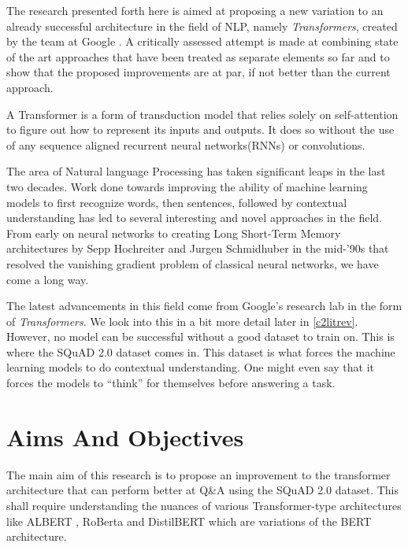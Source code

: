 \documentclass[a4paper,12pt]{report}
\begin{document}
		    The research presented forth here is aimed at proposing a new variation to an already successful architecture in the field of NLP, namely \textit{Transformers}, created by the team at Google \citep{atayl}. A critically assessed attempt is made at combining state of the art approaches that have been treated as separate elements so far and to show that the proposed improvements are at par, if not better than the current approach.

		    A Transformer is a form of transduction model that relies solely on self-attention to figure out how to represent its inputs and outputs. It does so without the use of any sequence aligned recurrent neural networks(RNNs) or convolutions.

            The area of Natural language Processing has taken significant leaps in the last two decades. Work done towards improving the ability of machine learning models to first recognize words, then sentences, followed by contextual understanding has led to several interesting and novel approaches in the field. From early on neural networks to creating Long Short-Term Memory architectures \citep{lstmoriginal} by Sepp Hochreiter and Jurgen Schmidhuber in the mid-'90s that resolved the vanishing gradient problem of classical neural networks, we have come a long way.

           The latest advancements in this field come from Google's research lab in the form of \textit{Transformers}. We look into this in a bit more detail later in \ref{c2litrev}. However, no model can be successful without a good dataset to train on. This is where the SQuAD 2.0 dataset \citep{dataset} comes in. This dataset is what forces the machine learning models to do contextual understanding. One might even say that it forces the models to ``think'' for themselves before answering a task.


        \section{Aims And Objectives}\label{12}
        	The main aim of this research is to propose an improvement to the transformer architecture that can perform better at Q\&A using the SQuAD 2.0 dataset. This shall require understanding the nuances of various Transformer-type architectures like ALBERT \citep{albert}, RoBerta \citep{roberta} and DistilBERT \citep{distil} which are variations of the BERT \citep{bert} architecture.
\end{document}
